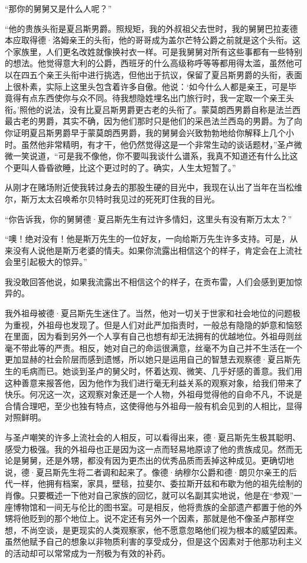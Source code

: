 \par “那你的舅舅又是什么人呢？”
\par “他的贵族头衔是夏吕斯男爵。照规矩，我的外叔祖父去世时，我的舅舅巴拉麦德本应取得德·洛姆亲王的头衔，他的哥哥成为盖尔芒特公爵之前就是这个头衔。这个家族里，人们更名改姓就像换衬衣一样。可是我舅舅对所有这些事都有一些特别的想法。他觉得意大利的公爵，西班牙的什么高级称呼等等都用得太滥，虽然他可以在四五个亲王头衔中进行挑选，但他出于抗议，保留了夏吕斯男爵的头衔，表面上很朴素，实际上这里头包含着许多自傲。他说：‘如今什么人都是亲王，可是毕竟得有点东西使你与众不同。待我想隐姓埋名出门旅行时，我一定取一个亲王头衔。’照他的说法，没有比夏吕斯男爵更古老的头衔了。蒙莫朗西男爵自称是法兰西最古老的男爵，其实不确，因为他们那时只是他们的采邑法兰西岛的男爵。为了向你证明夏吕斯男爵早于蒙莫朗西男爵，我的舅舅会兴致勃勃地给你解释上几个小时。虽然他非常精明，有才干，他仍然觉得这是一个非常生动的谈话题材，”圣卢微微一笑说道，“可是我不像他，你不要叫我谈什么谱系，我真不知道还有什么比这个更叫人昏昏欲睡，比这个更过时的了。确实，人生太短暂了。”
\par 从刚才在赌场附近使我转过身去的那股生硬的目光中，我现在认出了当年在当松维尔，斯万太太召唤希尔贝特时我见过的死死盯住我的目光。
\par “你告诉我，你的舅舅德·夏吕斯先生有过许多情妇，这里头有没有斯万太太？”
\par “噢！绝对没有！他是斯万先生的一位好友，一向给斯万先生许多支持。可是，从来没有人说他是斯万老婆的情夫。如果你流露出相信这个的样子，肯定会在上流社会里引起极大的惊异。”
\par 我没敢回答他说，如果我流露出不相信这个的样子，在贡布雷，人们会感到更加惊异的。
\par 我外祖母被德·夏吕斯先生迷住了。当然，他对一切关于世家和社会地位的问题极为重视，外祖母也发现了。但是人们对此严加指责时，一般总有隐隐的妒意和恼怒在里面，因为看到另外一个人享有自己也想有却无法拥有的优越地位。外祖母则丝毫不带此等的严责。相反，她对自己的命运很满意，丝毫不为自己并不生活在一个更加显赫的社会阶层而感到遗憾，所以她只是运用自己的智慧去观察德·夏吕斯先生的毛病而已。她谈到圣卢的舅父时，怀着达观、微笑、几乎好感的善意。我们用这种善意来报答他，因为他作为我们进行毫无利益关系的观察对象，给我们带来了快乐。何况这一次，这观察对象还是一个人物，外祖母觉得他的自命不凡，不说是合情合理吧，至少也独有特点，这使得他与外祖母一般有机会见到的人相比，显得对照鲜明。
\par 与圣卢嘲笑的许多上流社会的人相反，可以看得出来，德·夏吕斯先生极其聪明、感受力极强。我的外祖母也正是因为这一点而轻易地原谅了他的贵族成见。然而无论是舅舅，还是外甥，都没有因为更杰出的优秀品质而丢掉这种成见。更确切地说，德·夏吕斯先生将二者调和起来了。像德·纳穆尔公爵和德·朗贝尔亲王的后代一样，他拥有档案，家具，壁毯，拉斐尔、委拉斯开兹和布歇为他的祖先绘制的肖像。只要概述一下他对自己家族的回忆，就可以名副其实地说，他是在“参观”一座博物馆和一间无与伦比的图书室。可是相反，他将贵族的全部遗产都置于他的外甥将他贬到的那个地位上。说不定还有另外一个因素，那就是他不像圣卢那样空想，不尚空谈，是更现实的人类观察家，他不愿意忽略他们视为根本的威望因素。虽然他赋予自己的想象以非物质利害的享受成分，但是这个因素对于他那功利主义的活动却可以常常成为一剂极为有效的补药。
